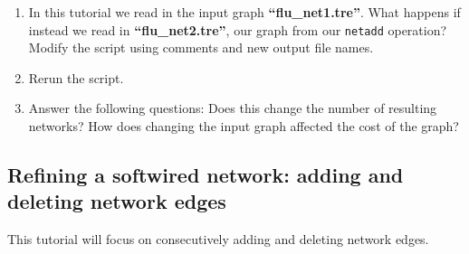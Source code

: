 \documentclass[11pt]{article}
\begin{document}
\begin {enumerate}
\item In this tutorial we read in the input graph \textbf{``flu\_net1.tre''}. What 
happens if instead we read in \textbf{``flu\_net2.tre''}, our graph from our 
\texttt{netadd} operation? \\

Modify the script using comments and new output file names.
	
\item Rerun the script.

\item Answer the following questions: 
\subitem Does this change the number of resulting networks?
\subitem How does changing the input graph affected the cost of the graph?

\end{enumerate}
\subsection{Refining a softwired network: adding and deleting network edges}
\label{subsec:netadddel}

This tutorial will focus on consecutively adding and deleting network edges.
\end{document}
